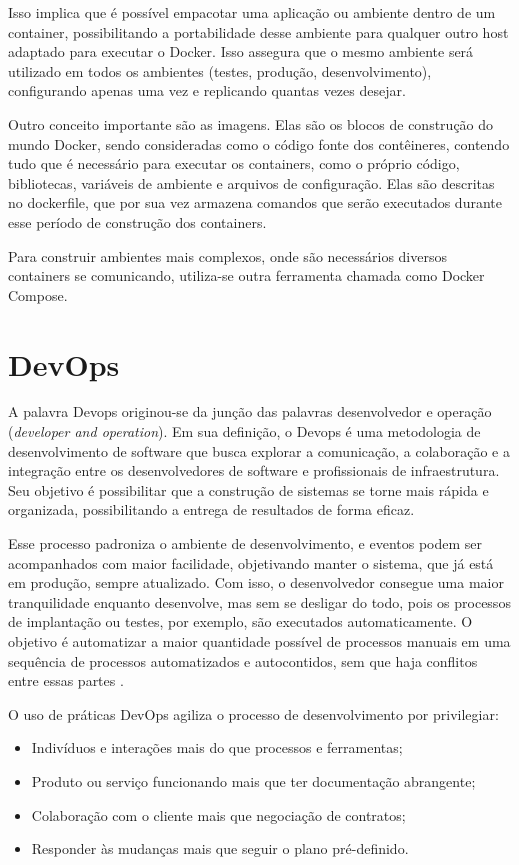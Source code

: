Isso implica que é possível empacotar uma aplicação ou ambiente dentro de um container, possibilitando a portabilidade desse ambiente para qualquer outro host adaptado para executar o Docker. Isso assegura que o mesmo ambiente será utilizado em todos os ambientes (testes, produção, desenvolvimento), configurando apenas uma vez e replicando quantas vezes desejar.

Outro conceito importante são as imagens. Elas são os blocos de construção do mundo Docker, sendo consideradas como o código fonte dos contêineres, contendo tudo que é necessário para executar os containers, como o próprio código, bibliotecas, variáveis de ambiente e arquivos de configuração. Elas são descritas no dockerfile, que por sua vez armazena comandos que serão executados durante esse período de construção dos containers. 

Para construir ambientes mais complexos, onde são necessários diversos containers se comunicando, utiliza-se outra ferramenta chamada como Docker Compose.

\section{DevOps}

A palavra Devops originou-se da junção das palavras desenvolvedor e operação (\textit{developer and operation}). Em sua definição, o Devops é uma metodologia de desenvolvimento de software que busca explorar a comunicação, a colaboração e a integração entre os desenvolvedores de software e profissionais de infraestrutura. Seu objetivo é possibilitar que a construção de sistemas se torne mais rápida e organizada, possibilitando a entrega de resultados de forma eficaz. 

Esse processo padroniza o ambiente de desenvolvimento, e eventos podem ser acompanhados com maior facilidade, objetivando manter o sistema, que já está em produção, sempre atualizado. Com isso, o desenvolvedor consegue uma maior tranquilidade enquanto desenvolve, mas sem se desligar do todo, pois os processos de implantação ou testes, por exemplo, são executados automaticamente. O objetivo é automatizar a maior quantidade possível de processos manuais em uma sequência de processos automatizados e autocontidos, sem que haja conflitos entre essas partes .

O uso de práticas DevOps agiliza o processo de desenvolvimento por privilegiar:
\begin{itemize}
    \item Indivíduos e interações mais do que processos e ferramentas;
    \item Produto ou serviço funcionando mais que ter documentação abrangente;
    \item Colaboração com o cliente mais que negociação de contratos;
    \item Responder às mudanças mais que seguir o plano pré-definido.
\end{itemize}

